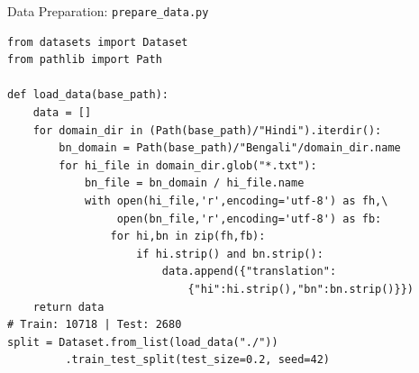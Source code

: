 \documentclass[aspectratio=169]{beamer}
\begin{document}
\begin{frame}[fragile]{Data Preparation: \texttt{prepare\_data.py}}
\begin{lstlisting}[style=pythonstyle]
from datasets import Dataset
from pathlib import Path

def load_data(base_path):
    data = []
    for domain_dir in (Path(base_path)/"Hindi").iterdir():
        bn_domain = Path(base_path)/"Bengali"/domain_dir.name
        for hi_file in domain_dir.glob("*.txt"):
            bn_file = bn_domain / hi_file.name
            with open(hi_file,'r',encoding='utf-8') as fh,\
                 open(bn_file,'r',encoding='utf-8') as fb:
                for hi,bn in zip(fh,fb):
                    if hi.strip() and bn.strip():
                        data.append({"translation":
                            {"hi":hi.strip(),"bn":bn.strip()}})
    return data
# Train: 10718 | Test: 2680
split = Dataset.from_list(load_data("./"))
         .train_test_split(test_size=0.2, seed=42)
\end{lstlisting}
\end{frame}
\end{document}

